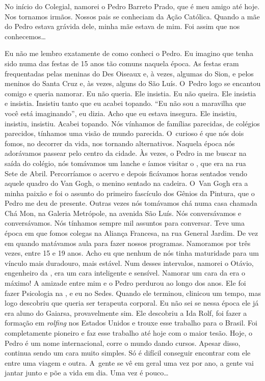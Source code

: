 No início do Colegial, namorei o Pedro Barreto Prado, que é meu amigo
até hoje. Nos tornamos irmãos. Nossos pais se conheciam da Ação
Católica. Quando a mãe do Pedro estava grávida dele, minha mãe estava de
mim. Foi assim que nos conhecemos…

Eu não me lembro exatamente de como conheci o Pedro. Eu imagino que
tenha sido numa das festas de 15 anos tão comuns naquela época. As
festas eram frequentadas pelas meninas do Des Oiseaux e, à vezes,
algumas do Sion, e pelos meninos do Santa Cruz e, às vezes, alguns do
São Luís. O~Pedro logo se encantou comigo e queria namorar. Eu não
queria. Ele insistia. Eu não queira. Ele insistia e insistia. Insistiu
tanto que eu acabei topando. ``Eu não sou a maravilha que você está
imaginando'', eu dizia. Acho que eu estava insegura. Ele insistiu,
insistiu, insistiu. Acabei topando. Nós vínhamos de famílias parecidas,
de colégios parecidos, tínhamos uma visão de mundo parecida. O~curioso é
que nós dois fomos, no decorrer da vida, nos tornando alternativos.
Naquela época nós adorávamos passear pelo centro da cidade. Às vezes, o
Pedro ia me buscar na saída do colégio, nós tomávamos um lanche e íamos
visitar o , que era na rua Sete de Abril. Percorríamos o acervo e
depois ficávamos horas sentados vendo aquele quadro do Van Gogh, o
menino sentado na cadeira. O~Van Gogh era a minha paixão e foi o assunto
do primeiro fascículo dos Gênios da Pintura, que o Pedro me deu de
presente. Outras vezes nós tomávamos chá numa casa chamada Chá Mon, na
Galeria Metrópole, na avenida São Luís. Nós conversávamos e
conversávamos. Nós tínhamos sempre mil assuntos para conversar. Teve uma
época em que fomos colegas na Aliança Francesa, na rua General Jardim.
De vez em quando matávamos aula para fazer nossos programas. Namoramos
por três vezes, entre 15 e 19 anos. Acho eu que nenhum de nós tinha
maturidade para um vínculo mais duradouro, mais estável. Num desses
intervalos, namorei o Otávio, engenheiro da , era um cara
inteligente e sensível. Namorar um cara da  era o máximo! A amizade
entre mim e o Pedro perdurou ao longo dos anos. Ele foi fazer Psicologia
na , e eu no Sedes. Quando ele terminou, clinicou um tempo, mas logo
descobriu que queria ser terapeuta corporal. Eu não sei se nessa época
ele já era aluno do Gaiarsa, provavelmente sim. Ele descobriu a Ida
Rolf, foi fazer a formação em \emph{rolfing} nos Estados Unidos e trouxe
esse trabalho para o Brasil. Foi completamente pioneiro e faz esse
trabalho até hoje com o maior tesão. Hoje, o Pedro é um nome
internacional, corre o mundo dando cursos. Apesar disso, continua sendo
um cara muito simples. Só é difícil conseguir encontrar com ele entre
uma viagem e outra. A~gente se vê em geral uma vez por ano, a gente vai
jantar junto e põe a vida em dia. Uma vez é pouco…

